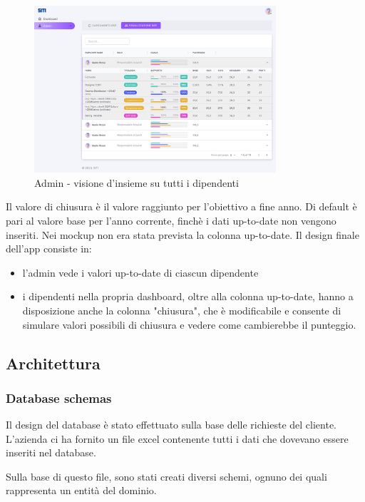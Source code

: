 \begin{figure}
    \centering
    \includegraphics[width=0.8\textwidth]{res/dati.png}
    \caption{Admin - visione d'insieme su tutti i dipendenti}
    \label{fig:dati}
\end{figure}


Il valore di chiusura è il valore raggiunto per l'obiettivo a fine anno. Di default è pari al valore base per l'anno corrente, finchè i dati up-to-date non vengono inseriti.
Nei mockup non era stata prevista la colonna up-to-date. Il design finale dell'app consiste in:
\begin{itemize}
    \item l'admin vede i valori up-to-date di ciascun dipendente
    \item i dipendenti nella propria dashboard, oltre alla colonna up-to-date, hanno a disposizione anche la colonna "chiusura", che è modificabile e consente di simulare valori possibili di chiusura e vedere come cambierebbe il punteggio.
\end{itemize}



\subsection*{Architettura}

\subsubsection{Database schemas}

Il design del database è stato effettuato sulla base delle richieste del cliente.
L'azienda ci ha fornito un file excel contenente tutti i dati che dovevano essere inseriti nel database.

Sulla base di questo file, sono stati creati diversi schemi, ognuno dei quali rappresenta un entità del dominio.

